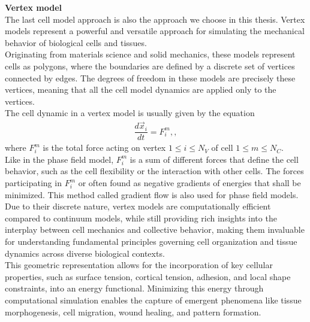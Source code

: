 \textbf{Vertex model} \\
The last cell model approach is also the approach we choose in this thesis. 
Vertex models represent a powerful and versatile approach for simulating the mechanical behavior of biological cells and tissues. \\
Originating from materials science and solid mechanics, these models represent cells as polygons, where the boundaries are defined by a discrete set of vertices connected by edges. 
The degrees of freedom in these models are precisely these vertices, meaning that all the cell model dynamics are applied only to the vertices. \\
The cell dynamic in a vertex model is usually given by the equation
\begin{align}
	\dfrac{d \vec{x}_i}{dt} = F_i^m, \label{eq:vertexmodel}, 
\end{align}
where $F_i^m$ is the total force acting on vertex $1 \leq i \leq N_V$ of cell $1 \leq m \leq N_C$. \\
Like in the phase field model, $F_i^m$ is a sum of different forces that define the cell behavior, such as the cell flexibility or the interaction with other cells. 
The forces participating in $F_i^m$ or often found as negative gradients of energies that shall be minimized. 
This method called gradient flow is also used for phase field models. \\
Due to their discrete nature, vertex models are computationally efficient compared to continuum models, while still providing rich insights into the interplay between cell mechanics and collective behavior, making them invaluable for understanding fundamental principles governing cell organization and tissue dynamics across diverse biological contexts. \\
This geometric representation allows for the incorporation of key cellular properties, such as surface tension, cortical tension, adhesion, and local shape constraints, into an energy functional. 
Minimizing this energy through computational simulation enables the capture of emergent phenomena like tissue morphogenesis, cell migration, wound healing, and pattern formation. \\


